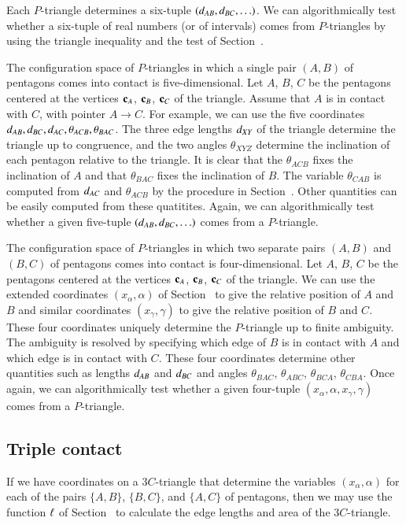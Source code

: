 Each $P$-triangle determines a six-tuple $(d_{AB},d_{BC},\ldots)$.
We can algorithmically test whether a six-tuple of real numbers (or of
intervals) comes from $P$-triangles by using the triangle inequality
and the test of Section~.

The configuration space of $P$-triangles in which a single pair
$(A,B)$ of pentagons comes into contact is five-dimensional.  Let $A$,
$B$, $C$ be the pentagons centered at the vertices ${\mathbf c}_A$, ${\mathbf c}_B$,
${\mathbf c}_C$ of the triangle.  Assume that $A$ is in contact with $C$, with
pointer $A\to C$.  For example, we can use the five coordinates
$d_{AB},d_{BC},d_{AC},\theta_{ACB},\theta_{BAC}$.  The three edge
lengths $d_{XY}$ of the triangle determine the triangle up to
congruence, and the two angles $\theta_{XYZ}$ determine the
inclination of each pentagon relative to the triangle.  It is clear
that the $\theta_{ACB}$ fixes the inclination of $A$ and that
$\theta_{BAC}$ fixes the inclination of $B$.  The variable
$\theta_{CAB}$ is computed from $d_{AC}$ and $\theta_{ACB}$ by the
procedure in Section~.  Other quantities can be easily
computed from these quatitites. Again, we can algorithmically
test whether a given five-tuple $(d_{AB},d_{BC},\ldots)$ 
comes from a $P$-triangle.

The configuration space of $P$-triangles in which two separate pairs
$(A,B)$ and $(B,C)$ of pentagons comes into contact is
four-dimensional.  Let $A$, $B$, $C$ be the pentagons centered at the
vertices ${\mathbf c}_A$, ${\mathbf c}_B$, ${\mathbf c}_C$ of the triangle.  We can use the
extended coordinates $(x_\alpha,\alpha)$ of Section~
to give the relative position of $A$ and $B$ and similar coordinates
$(x_\gamma,\gamma)$ to give the relative position of $B$ and $C$.
These four coordinates uniquely determine the $P$-triangle up to
finite ambiguity.  The ambiguity is resolved by specifying which edge
of $B$ is in contact with $A$ and which edge is in contact with $C$.
These four coordinates determine other quantities such as lengths
$d_{AB}$ and $d_{BC}$ and angles $\theta_{BAC}$, $\theta_{ABC}$,
$\theta_{BCA}$, $\theta_{CBA}$.  Once again, we can algorithmically
test whether a given four-tuple $(x_\alpha,\alpha,x_\gamma,\gamma)$
comes from a $P$-triangle.

\subsection{Triple contact}

If we have coordinates on a $3C$-triangle that determine the variables
$(x_\alpha,\alpha)$ for each of the pairs $\{A,B\}$, $\{B,C\}$, and
$\{A,C\}$ of pentagons, then we may use the function $\ell$ of
Section~ to calculate the edge lengths and area of the
$3C$-triangle.

